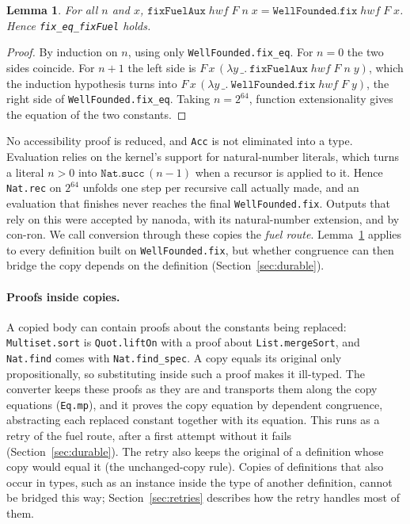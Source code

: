 \documentclass[11pt]{article}
\newtheorem{lemma}{Lemma}
\begin{document}
\begin{lemma}\label{lem:fuel}
For all \(n\) and \(x\), \(\mathtt{fixFuelAux}\;\mathit{hwf}\;F\;n\;x = \mathtt{WellFounded.fix}\;\mathit{hwf}\;F\;x\).
Hence \texttt{fix\_eq\_fixFuel} holds.
\end{lemma}
\begin{proof}
By induction on \(n\), using only \texttt{WellFounded.fix\_eq}. For \(n = 0\) the two sides coincide. For
\(n+1\) the left side is \(F\,x\,(\lambda y\,\_.\ \mathtt{fixFuelAux}\;\mathit{hwf}\;F\;n\;y)\), which the
induction hypothesis turns into \(F\,x\,(\lambda y\,\_.\ \mathtt{WellFounded.fix}\;\mathit{hwf}\;F\;y)\), the
right side of \texttt{WellFounded.fix\_eq}. Taking \(n = 2^{64}\), function extensionality gives the equation
of the two constants.
\end{proof}
No accessibility proof is reduced, and \texttt{Acc} is not eliminated into a type. Evaluation relies on the kernel's support for natural-number literals,
which turns a literal \(n>0\) into \(\mathtt{Nat.succ}\,(n-1)\) when a recursor is applied to it.
Hence \texttt{Nat.rec} on \(2^{64}\) unfolds one step per recursive call actually made, and an
evaluation that finishes never reaches the final \texttt{WellFounded.fix}. Outputs that rely on this were
accepted by nanoda, with its natural-number extension, and by con-ron. We call conversion through these copies the
\emph{fuel route}. Lemma~\ref{lem:fuel} applies to every definition built on
\texttt{WellFounded.fix}, but whether congruence can then bridge the copy depends on the
definition (Section~\ref{sec:durable}).

\paragraph{Proofs inside copies.} A copied body can contain proofs about the constants being
replaced: \texttt{Multiset.sort} is \texttt{Quot.liftOn} with a proof about
\texttt{List.mergeSort}, and \texttt{Nat.find} comes with \texttt{Nat.find\_spec}. A copy equals
its original only propositionally, so substituting inside such a proof makes it ill-typed. The
converter keeps these proofs as they are and transports them along the copy equations
(\texttt{Eq.mp}), and it proves the copy equation by dependent congruence, abstracting each
replaced constant together with its equation. This runs as a retry of the fuel route, after a first
attempt without it fails (Section~\ref{sec:durable}). The retry also keeps the original of a
definition whose copy would equal it (the unchanged-copy rule). Copies of definitions that also occur in types, such
as an instance inside the type of another definition, cannot be bridged this way;
Section~\ref{sec:retries} describes how the retry handles most of them.
\end{document}
